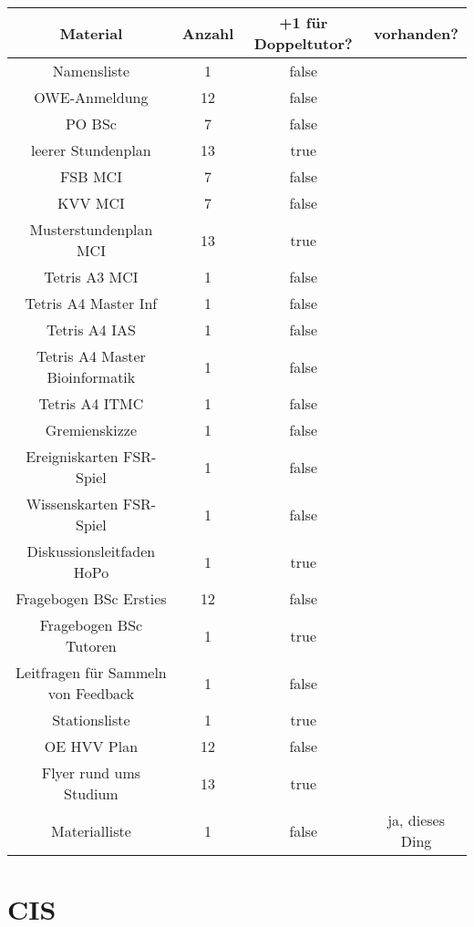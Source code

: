 \documentclass[10pt,a4paper,oneside,ngerman,numbers=noenddot]{scrartcl}
\begin{document}
	\begin{tabular}{c|c|c|c}
		\textbf{Material} & \textbf{Anzahl} & \textbf{+1 für Doppeltutor?} & \textbf{vorhanden?} \\
		\hline
		Namensliste & 1 & false & \\
		\hline
		OWE-Anmeldung & 12 & false & \\
		\hline
		PO BSc & 7 & false & \\
		\hline
		leerer Stundenplan & 13 & true & \\
		\hline
		FSB MCI & 7 & false & \\
		\hline
		KVV MCI & 7 & false & \\
		\hline
		Musterstundenplan MCI & 13 & true & \\
		\hline
		Tetris A3 MCI & 1 & false & \\
		\hline
		Tetris A4 Master Inf & 1 & false & \\
		\hline
		Tetris A4 IAS & 1 & false & \\
		\hline
		Tetris A4 Master Bioinformatik & 1 & false & \\
		\hline
		Tetris A4 ITMC & 1 & false & \\
		\hline
		Gremienskizze & 1 & false & \\
		\hline
		Ereigniskarten FSR-Spiel & 1 & false & \\
		\hline
		Wissenskarten FSR-Spiel & 1 & false & \\
		\hline
		Diskussionsleitfaden HoPo & 1 & true & \\
		\hline
		Fragebogen BSc Ersties & 12 & false & \\
		\hline
		Fragebogen BSc Tutoren & 1 & true & \\
		\hline
		Leitfragen für Sammeln von Feedback & 1 & false & \\
		\hline
		Stationsliste & 1 & true & \\
		\hline
		OE HVV Plan & 12 & false & \\
		\hline
		Flyer rund ums Studium & 13 & true & \\
		\hline
		Materialliste & 1 & false & ja, dieses Ding \\
	\end{tabular}

\section{CIS}
\end{document}
